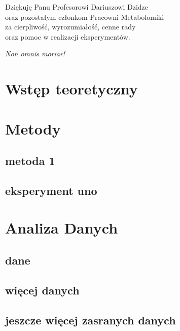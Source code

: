 \documentclass[12pt, a4paper]{article}
\begin{document}


\newpage
\thispagestyle{empty}
\begin{flushright}
    Dziękuję Panu Profesorowi Dariuszowi Dzidze\\
    oraz pozostałym członkom Pracowni Metabolomiki\\
    za cierpliwość, wyrozumiałość, cenne rady\\
    oraz pomoc w realizacji eksperymentów.
\end{flushright}
\vspace*{\fill}
\begin{flushleft}
    \textit{Non omnis moriar!}
\end{flushleft}


\newpage
\setcounter{page}{3}

\tableofcontents



\section{Wstęp teoretyczny}\label{sec:wstęp-teoretyczny}


\section{Metody}\label{sec:metody}

\subsection{metoda 1}
\lipsum[2]
\subsection{eksperyment uno}
\lipsum[3-5]

\section{Analiza Danych}\label{sec:analiza-danych}
\subsection{dane}
\lipsum[2-4]
\subsection{więcej danych}
\lipsum[2-4]
\subsection{jeszcze więcej zasranych danych}
\lipsum[2-4]

\begin{otherlanguage}{polish}
    \newpage
    \thispagestyle{empty}
    
    
\end{otherlanguage}
\end{document}
